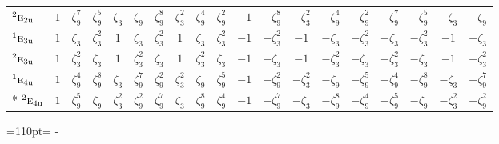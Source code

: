 \documentclass[10pt,a4paper]{article}
\newcommand{\needspace}[1]{\par\penalty-100\begingroup\dimen0=#1\relax\dimen2=\pagegoal
  \advance\dimen2-\pagetotal\ifdim\dimen0>\dimen2\relax\ifdim\dimen2>0pt\vfil\break\fi\fi
  \endgroup}
\numberwithin{equation}{section}
\newcommand{\irr}[1]{\text{\normalfont\scshape #1}}
\newcommand{\conjpair}[1]{{}^{#1}}
\newcommand{\ptag}[1]{\mathrm{#1}}
\newcommand{\rootunity}[1]{\zeta_{#1}}
\begin{document}
{\begin{longtable}{@{}lcccccccccccccccccc@{}}
$\conjpair{2}\irr{e}_{2\ptag{u}}$ & $1$ & $\rootunity{9}^{7}$ & $\rootunity{9}^{5}$ & $\rootunity{3}$ & $\rootunity{9}$ & $\rootunity{9}^{8}$ & $\rootunity{3}^{2}$ & $\rootunity{9}^{4}$ & $\rootunity{9}^{2}$ & $-1$ & $-\rootunity{9}^{8}$ & $-\rootunity{3}^{2}$ & $-\rootunity{9}^{4}$ & $-\rootunity{9}^{2}$ & $-\rootunity{9}^{7}$ & $-\rootunity{9}^{5}$ & $-\rootunity{3}$ & $-\rootunity{9}$\\
$\conjpair{1}\irr{e}_{3\ptag{u}}$ & $1$ & $\rootunity{3}$ & $\rootunity{3}^{2}$ & $1$ & $\rootunity{3}$ & $\rootunity{3}^{2}$ & $1$ & $\rootunity{3}$ & $\rootunity{3}^{2}$ & $-1$ & $-\rootunity{3}^{2}$ & $-1$ & $-\rootunity{3}$ & $-\rootunity{3}^{2}$ & $-\rootunity{3}$ & $-\rootunity{3}^{2}$ & $-1$ & $-\rootunity{3}$\\
$\conjpair{2}\irr{e}_{3\ptag{u}}$ & $1$ & $\rootunity{3}^{2}$ & $\rootunity{3}$ & $1$ & $\rootunity{3}^{2}$ & $\rootunity{3}$ & $1$ & $\rootunity{3}^{2}$ & $\rootunity{3}$ & $-1$ & $-\rootunity{3}$ & $-1$ & $-\rootunity{3}^{2}$ & $-\rootunity{3}$ & $-\rootunity{3}^{2}$ & $-\rootunity{3}$ & $-1$ & $-\rootunity{3}^{2}$\\
$\conjpair{1}\irr{e}_{4\ptag{u}}$ & $1$ & $\rootunity{9}^{4}$ & $\rootunity{9}^{8}$ & $\rootunity{3}$ & $\rootunity{9}^{7}$ & $\rootunity{9}^{2}$ & $\rootunity{3}^{2}$ & $\rootunity{9}$ & $\rootunity{9}^{5}$ & $-1$ & $-\rootunity{9}^{2}$ & $-\rootunity{3}^{2}$ & $-\rootunity{9}$ & $-\rootunity{9}^{5}$ & $-\rootunity{9}^{4}$ & $-\rootunity{9}^{8}$ & $-\rootunity{3}$ & $-\rootunity{9}^{7}$\\*
$\conjpair{2}\irr{e}_{4\ptag{u}}$ & $1$ & $\rootunity{9}^{5}$ & $\rootunity{9}$ & $\rootunity{3}^{2}$ & $\rootunity{9}^{2}$ & $\rootunity{9}^{7}$ & $\rootunity{3}$ & $\rootunity{9}^{8}$ & $\rootunity{9}^{4}$ & $-1$ & $-\rootunity{9}^{7}$ & $-\rootunity{3}$ & $-\rootunity{9}^{8}$ & $-\rootunity{9}^{4}$ & $-\rootunity{9}^{5}$ & $-\rootunity{9}$ & $-\rootunity{3}^{2}$ & $-\rootunity{9}^{2}$\\
\bottomrule\end{longtable}}
\needspace{110pt}
\end{document}
